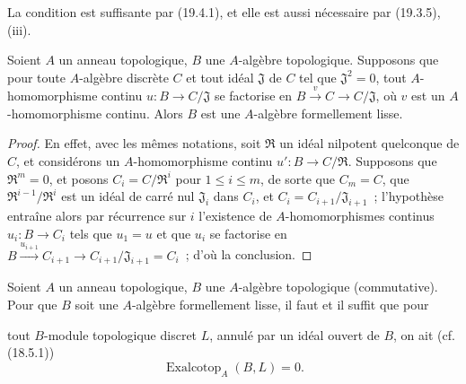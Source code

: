 La condition est suffisante par (19.4.1), et elle est aussi nécessaire par
(19.3.5), (iii).

\begin{proposition}[19.4.3]
\label{0.19.4.3-fr}
Soient $A$ un anneau topologique, $B$ une $A$-algèbre topologique. Supposons
que pour toute $A$-algèbre discrète $C$ et tout idéal $\mathfrak J$ de $C$
tel que $\mathfrak J^2=0$, tout $A$-homomorphisme continu
$u:B\to C/\mathfrak J$ se factorise en
$B\xrightarrow{v}C\to C/\mathfrak J$, où $v$ est un $A$-homomorphisme
continu. Alors $B$ est une $A$-algèbre formellement lisse.
\end{proposition}

\begin{proof}
En effet, avec les mêmes notations, soit $\mathfrak R$ un idéal nilpotent
quelconque de $C$, et considérons un $A$-homomorphisme continu
$u':B\to C/\mathfrak R$. Supposons que $\mathfrak R^m=0$, et posons
$C_i=C/\mathfrak R^i$ pour $1\leq i\leq m$, de sorte que $C_m=C$, que
$\mathfrak R^{i-1}/\mathfrak R^i$ est un idéal de carré nul
$\mathfrak J_i$ dans $C_i$, et $C_i=C_{i+1}/\mathfrak J_{i+1}$~;
l'hypothèse entraîne alors par récurrence sur $i$ l'existence de
$A$-homomorphismes continus $u_i:B\to C_i$ tels que $u_1=u$ et que $u_i$
se factorise en
$B\xrightarrow{u_{i+1}}C_{i+1}\to C_{i+1}/\mathfrak J_{i+1}=C_i$~;
d'où la conclusion.
\end{proof}

\begin{proposition}[19.4.4]
\label{0.19.4.4-fr}
Soient $A$ un anneau topologique, $B$ une $A$-algèbre topologique
(commutative). Pour que $B$ soit une $A$-algèbre formellement lisse, il faut et
il suffit que pour


tout $B$-module topologique discret $L$, annulé par un idéal ouvert de $B$, on
ait (cf. (18.5.1))
\[
  \operatorname{Exalcotop}_A(B,L)=0.
\]
\end{proposition}


